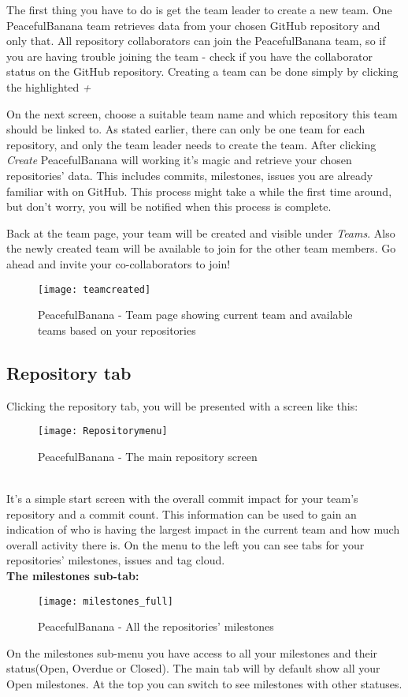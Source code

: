 The first thing you have to do is get the team leader to create a new team. One PeacefulBanana team retrieves data from your chosen GitHub repository and only that. All repository collaborators can join the PeacefulBanana team, so if you are having trouble joining the team - check if you have the collaborator status on the GitHub repository. Creating a team can be done simply by clicking the highlighted \emph{+}

On the next screen, choose a suitable team name and which repository this team should be linked to. As stated earlier, there can only be one team for each repository, and only the team leader needs to create the team. After clicking \textit{Create} PeacefulBanana will working it's magic and retrieve your chosen repositories' data. This includes commits, milestones, issues you are already familiar with on GitHub. This process might take a while the first time around, but don't worry, you will be notified when this process is complete.

Back at the team page, your team will be created and visible under \emph{Teams}. Also the newly created team will be available to join for the other team members. Go ahead and invite your co-collaborators to join!

\begin{figure}[h!]
\label{teamcreated}
\centering
	\texttt{[image: teamcreated]}
\caption{PeacefulBanana - Team page showing current team and available teams based on your repositories}
\end{figure}

%
%

\subsection{Repository tab}
Clicking the repository tab, you will be presented with a screen like this:
\begin{figure}[h!]
\label{repository}
\centering
	\texttt{[image: Repositorymenu]}
\caption{PeacefulBanana - The main repository screen}
\end{figure}
\\
It's a simple start screen with the overall commit impact for your team's repository and a commit count. This information can be used to gain an indication of who is having the largest impact in the current team and how much overall activity there is. 
On the menu to the left you can see tabs for your repositories' milestones, issues and tag cloud.
\\
\textbf{The milestones sub-tab:}
\begin{figure}[h!]
\label{milestones}
\centering
	\texttt{[image: milestones\_full]}
\caption{PeacefulBanana - All the repositories' milestones}
\end{figure}
\newpage
On the milestones sub-menu you have access to all your milestones and their status(Open, Overdue or Closed). The main tab will by default show all your Open milestones. At the top you can switch to see milestones with other statuses.

